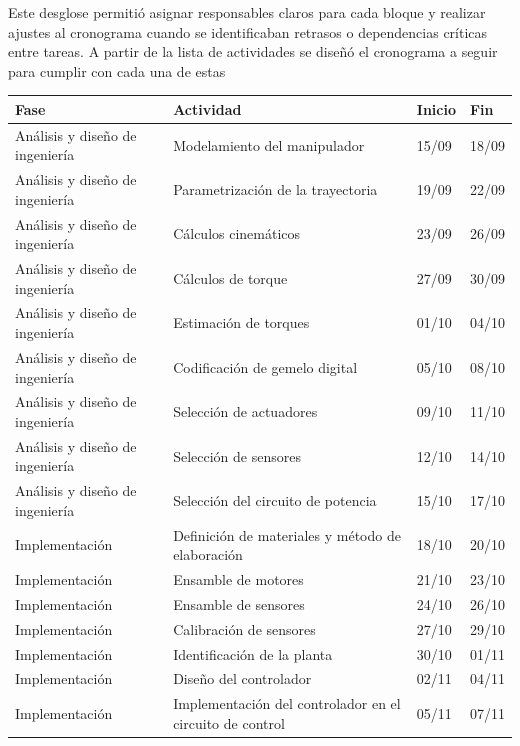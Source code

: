 \documentclass[11pt,a4paper]{article}
\begin{document}
Este desglose permitió asignar responsables claros para cada bloque y realizar ajustes al
cronograma cuando se identificaban retrasos o dependencias críticas entre tareas.
A partir de la lista de actividades se diseñó el cronograma a seguir para cumplir con cada una de estas

\begin{table}[htbp]

    \begin{tabular}{p{3.5cm}p{7cm}p{2cm}p{2cm}}
        \hline
        \textbf{Fase} & \textbf{Actividad} & \textbf{Inicio} & \textbf{Fin} \\
        \hline
        Análisis y diseño de ingeniería & Modelamiento del manipulador & 15/09 & 18/09 \\
        Análisis y diseño de ingeniería & Parametrización de la trayectoria & 19/09 & 22/09 \\
        Análisis y diseño de ingeniería & Cálculos cinemáticos & 23/09 & 26/09 \\
        Análisis y diseño de ingeniería & Cálculos de torque & 27/09 & 30/09 \\
        Análisis y diseño de ingeniería & Estimación de torques & 01/10 & 04/10 \\
        Análisis y diseño de ingeniería & Codificación de gemelo digital & 05/10 & 08/10 \\
        Análisis y diseño de ingeniería & Selección de actuadores & 09/10 & 11/10 \\
        Análisis y diseño de ingeniería & Selección de sensores & 12/10 & 14/10 \\
        Análisis y diseño de ingeniería & Selección del circuito de potencia & 15/10 & 17/10 \\
        Implementación & Definición de materiales y método de elaboración & 18/10 & 20/10 \\
        Implementación & Ensamble de motores & 21/10 & 23/10 \\
        Implementación & Ensamble de sensores & 24/10 & 26/10 \\
        Implementación & Calibración de sensores & 27/10 & 29/10 \\
        Implementación & Identificación de la planta & 30/10 & 01/11 \\
        Implementación & Diseño del controlador & 02/11 & 04/11 \\
        Implementación & Implementación del controlador en el circuito de control & 05/11 & 07/11 \\

\end{tabular}
\end{table}
\end{document}
